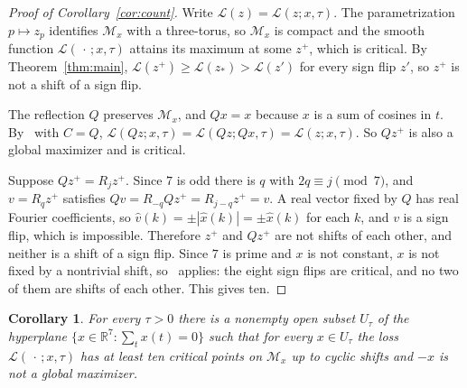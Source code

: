 \documentclass[11pt]{article}
\newtheorem{corollary}[theorem]{Corollary}
\theoremstyle{remark}
\newcommand{\R}{\mathbb{R}}
\begin{document}
\begin{proof}[Proof of Corollary~\ref{cor:count}]
Write $\mathcal L(z)=\mathcal L(z;x,\tau)$. The parametrization $p\mapsto z_p$ identifies $\mathcal M_x$ with a three-torus, so $\mathcal M_x$ is compact and the smooth function $\mathcal L(\,\cdot\,;x,\tau)$ attains its maximum at some $z^+$, which is critical. By Theorem~\ref{thm:main}, $\mathcal L(z^+)\ge\mathcal L(z_*)>\mathcal L(z')$ for every sign flip $z'$, so $z^+$ is not a shift of a sign flip.

The reflection $Q$ preserves $\mathcal M_x$, and $Qx=x$ because $x$ is a sum of cosines in $t$. By~\cite[Lemma~3.1]{SSA24} with $C=Q$, $\mathcal L(Qz;x,\tau)=\mathcal L(Qz;Qx,\tau)=\mathcal L(z;x,\tau)$. So $Qz^+$ is also a global maximizer and is critical.

Suppose $Qz^+=R_jz^+$. Since $7$ is odd there is $q$ with $2q\equiv j\pmod 7$, and $v=R_qz^+$ satisfies $Qv=R_{-q}Qz^+=R_{j-q}z^+=v$. A real vector fixed by $Q$ has real Fourier coefficients, so $\widehat v(k)=\pm|\widehat x(k)|=\pm\widehat x(k)$ for each $k$, and $v$ is a sign flip, which is impossible. Therefore $z^+$ and $Qz^+$ are not shifts of each other, and neither is a shift of a sign flip. Since $7$ is prime and $x$ is not constant, $x$ is not fixed by a nontrivial shift, so~\cite[Proposition~3.7]{SSA24} applies: the eight sign flips are critical, and no two of them are shifts of each other. This gives ten.
\end{proof}

\begin{corollary}\label{cor:open}
For every $\tau>0$ there is a nonempty open subset $U_\tau$ of the hyperplane $\{x\in\R^7:\sum_tx(t)=0\}$ such that for every $x\in U_\tau$ the loss $\mathcal L(\,\cdot\,;x,\tau)$ has at least ten critical points on $\mathcal M_x$ up to cyclic shifts and $-x$ is not a global maximizer.
\end{corollary}
\end{document}
